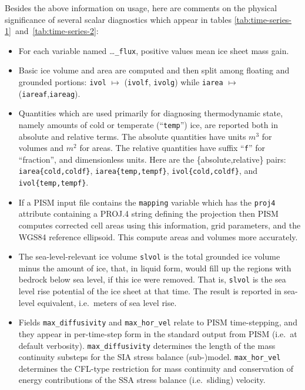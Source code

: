 Besides the above information on usage, here are comments on the physical significance of several scalar diagnostics which appear in tables \ref{tab:time-series-1}~and~\ref{tab:time-series-2}:
\begin{itemize}
  \item For each variable named \dots\texttt{_flux}, positive values mean ice sheet mass gain.
  \item Basic ice volume and area are computed and then split among floating and grounded portions: \texttt{ivol} $\mapsto$ (\texttt{ivolf}, \texttt{ivolg}) while \texttt{iarea} $\mapsto$ (\texttt{iareaf},\texttt{iareag}).
  \item Quantities which are used primarily for diagnosing thermodynamic state, namely amounts of cold or temperate (``\texttt{temp}'') ice, are reported both in absolute and relative terms.  The absolute quantities have units \textsl{$m^3$} for volumes and \textsl{$m^2$} for areas.  The relative quantities have suffix ``\texttt{f}'' for ``fraction'', and dimensionless units.  Here are the \{absolute,relative\} pairs: \texttt{iarea\{cold,coldf\}}, \texttt{iarea\{temp,tempf\}}, \texttt{ivol\{cold,coldf\}},  and \texttt{ivol\{temp,tempf\}}.
  \item If a PISM input file contains the \texttt{mapping} variable which has the
\texttt{proj4} attribute containing a PROJ.4 string defining the projection then PISM computes corrected cell areas
using this information, grid parameters, and the WGS84 reference ellipsoid. This compute areas and volumes more accurately.
  \item The sea-level-relevant ice volume \texttt{slvol} is the total grounded ice volume minus the amount of ice, that, in liquid form, would fill up the regions with bedrock below sea level, if this ice were removed.  That is, \texttt{slvol} is the sea level rise potential of the ice sheet at that time.  The result is reported  in sea-level equivalent, i.e.~meters of sea level rise.
  \item Fields \texttt{max_diffusivity} and \texttt{max_hor_vel} relate to PISM time-stepping, and they appear in per-time-step form in the standard output from PISM (i.e.~at default verbosity).  \texttt{max_diffusivity} determines the length of the mass continuity substeps for the SIA stress balance (sub-)model.  \texttt{max_hor_vel} determines the CFL-type restriction for mass continuity and conservation of energy contributions of the SSA stress balance (i.e.~sliding) velocity.
\end{itemize}

